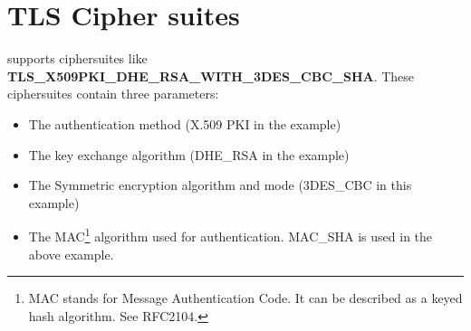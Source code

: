 \newpage
\section{TLS Cipher suites}
\par 
{} supports ciphersuites like {\bf TLS\_X509PKI\_DHE\_RSA\_WITH\_3DES\_CBC\_SHA}.
These ciphersuites contain three parameters:
\begin{itemize}
\item The authentication method (X.509 PKI in the example)
\item The key exchange algorithm (DHE\_RSA in the example)
\item The Symmetric encryption algorithm and mode (3DES\_CBC in this
example)
\item The MAC\footnote{MAC stands for Message Authentication Code. It can
be described as a keyed hash algorithm. See RFC2104.} algorithm used for authentication.
MAC\_SHA is used in the above example.
\end{itemize}

\addvspace{1.5cm}

